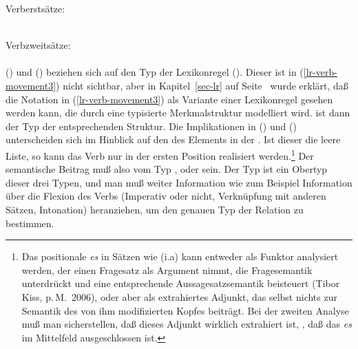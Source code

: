\eas
Verberstsätze:\\
 \impl\\
\zs

\eas
\label{impl-v2}
Verbzweitsätze:\\
 \impl\\
\zs
() und () beziehen sich auf den Typ der Lexikonregel ().
Dieser ist in (\ref{lr-verb-movement3}) nicht sichtbar, aber in Kapitel~\ref{sec-lr}
auf Seite~\pageref{pageref-lr-mit-dtr} wurde erklärt, daß die Notation in (\ref{lr-verb-movement3})
als Variante einer Lexikonregel gesehen werden kann, die durch eine typisierte Merkmalstruktur
modelliert wird.  ist dann der Typ der entsprechenden Struktur.
Die Implikationen in () und () unterscheiden sich im Hinblick auf den \slashw
des Elements in der \subcatl. Ist dieser die leere Liste, so kann das Verb nur in der ersten
Position realisiert werden.\footnote{
  Das positionale \emph{es} in Sätzen wie (i.a) kann entweder als Funktor analysiert werden, der einen
  Fragesatz als Argument nimmt, die Fragesemantik unterdrückt und eine entsprechende
  Aussagesatzsemantik beisteuert (Tibor Kiss, p.\,M.\ 2006), oder aber als
  extrahiertes Adjunkt, das selbst nichts zur Semantik des von ihm modifizierten Kopfes
  beiträgt. Bei der zweiten Analyse muß man sicherstellen, daß dieses Adjunkt wirklich extrahiert
  ist, \dash, daß das \emph{es} im Mittelfeld ausgeschlossen ist.
\eal
{}
\zllast
}
Der semantische Beitrag muß also vom Typ , 
oder  sein. Der Typ  ist
ein Obertyp dieser drei Typen, und man muß weiter Information wie zum Beispiel Information über
die Flexion des Verbs (Imperativ oder nicht, Verknüpfung mit anderen Sätzen, Intonation) heranziehen,
um den genauen Typ der Relation zu bestimmen.

